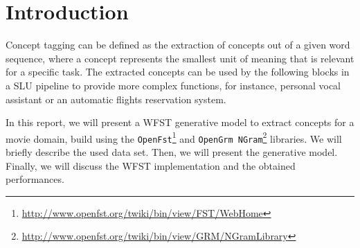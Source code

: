 \section{Introduction}
\label{sec:introduction}

Concept tagging can be defined as the extraction of concepts out of a given word sequence,
where a concept represents the smallest unit of meaning that is relevant for a specific task.
The extracted concepts can be used by the following blocks in a \ac{SLU} pipeline to provide more complex functions, for instance, personal vocal assistant or an automatic flights reservation system.

In this report, we will present a \ac{WFST} generative model to extract concepts for a movie domain, build using
the \texttt{OpenFst}\footnote{\url{http://www.openfst.org/twiki/bin/view/FST/WebHome}}
and \texttt{OpenGrm NGram}\footnote{\url{http://www.openfst.org/twiki/bin/view/GRM/NGramLibrary}} libraries.
We will briefly describe the used data set.
Then, we will present the generative model.
Finally, we will discuss the \ac{WFST} implementation and the obtained performances.
